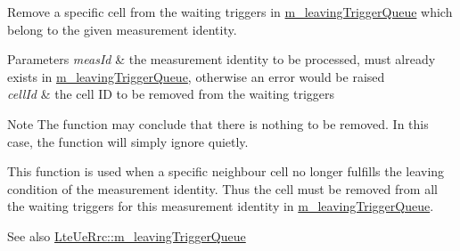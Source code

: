 Remove a specific cell from the waiting triggers in \hyperlink{classns3_1_1LteUeRrc_a7984d05cbcc51cd9239a22bd7e400d06}{m\+\_\+leaving\+Trigger\+Queue} which belong to the given measurement identity. 


\begin{DoxyParams}{Parameters}
{\em meas\+Id} & the measurement identity to be processed, must already exists in \hyperlink{classns3_1_1LteUeRrc_a7984d05cbcc51cd9239a22bd7e400d06}{m\+\_\+leaving\+Trigger\+Queue}, otherwise an error would be raised \\
\hline
{\em cell\+Id} & the cell ID to be removed from the waiting triggers\\
\hline
\end{DoxyParams}
\begin{DoxyNote}{Note}
The function may conclude that there is nothing to be removed. In this case, the function will simply ignore quietly.
\end{DoxyNote}
This function is used when a specific neighbour cell no longer fulfills the leaving condition of the measurement identity. Thus the cell must be removed from all the waiting triggers for this measurement identity in \hyperlink{classns3_1_1LteUeRrc_a7984d05cbcc51cd9239a22bd7e400d06}{m\+\_\+leaving\+Trigger\+Queue}.

\begin{DoxySeeAlso}{See also}
\hyperlink{classns3_1_1LteUeRrc_a7984d05cbcc51cd9239a22bd7e400d06}{Lte\+Ue\+Rrc\+::m\+\_\+leaving\+Trigger\+Queue} 
\end{DoxySeeAlso}

